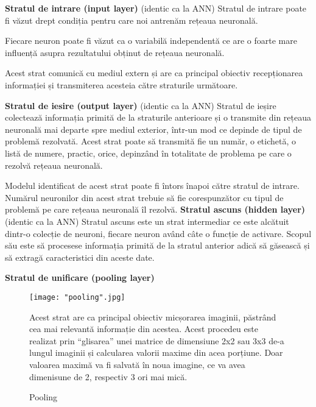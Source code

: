 \documentclass[a4paper, 12pt]{article}
\begin{document}
\begin{outline}
\begin{figure}[!htb]
		\end{figure}\par
		\bigskip
		\1 \textbf{Stratul de intrare (input layer)} (identic ca la ANN) \textbf{\cite{brandonrohrer}}
		\2 \quad Stratul de intrare poate fi văzut drept condiția pentru care noi antrenăm rețeaua neuronală. 
		
		\quad Fiecare neuron poate fi văzut ca o variabilă independentă ce are o foarte mare influență asupra rezultatului obținut de rețeaua neuronală. 
		
		\quad Acest strat comunică cu mediul extern și are ca principal obiectiv recepționarea informației și transmiterea acesteia către straturile următoare.
		
		\bigskip
		\1 \textbf{Stratul de iesire (output layer)} (identic ca la ANN) \textbf{\cite{brandonrohrer}}
		\2 \quad Stratul de ieșire colectează informația primită de la straturile anterioare și o transmite din rețeaua neuronală mai departe spre mediul exterior, într-un mod ce depinde de tipul de problemă rezolvată. Acest strat poate să transmită fie un număr, o etichetă, o listă de numere, practic, orice, depinzând în totalitate de problema pe care o rezolvă rețeaua neuronală.
		
		\quad Modelul identificat de acest strat poate fi întors înapoi către stratul de intrare. Numărul neuronilor din acest strat trebuie să fie corespunzător cu tipul de problemă pe	care rețeaua neuronală îl rezolvă.
		\1 \textbf{Stratul ascuns (hidden layer)} (identic ca la ANN)	 \textbf{\cite{brandonrohrer}}
		\2 \quad Stratul ascuns este un strat intermediar ce este alcătuit dintr-o colecție de neuroni, fiecare neuron având câte o funcție de activare. Scopul său este să procesese informația primită de la stratul anterior adică să găsească și să extragă caracteristici din aceste date.
		
		\bigskip
		\1 \textbf{Stratul de unificare (pooling layer)} \textbf{\cite{brandonrohrer}}
		\bigskip
		\begin{figure}[!htb]
			\centering
			\begin{minipage}{0.4\textwidth}
				\centering
				\texttt{[image: "pooling".jpg]}
				\caption{Pooling \textbf{\cite{brandonrohrer}} }\label{fig:pooling}
			\end{minipage}
			\begin{minipage}{0.5\textwidth}
				\centering
				Acest strat are ca principal obiectiv micșorarea imaginii, păstrând cea mai relevantă informație din acestea. Acest procedeu este realizat prin “glisarea” unei matrice de dimensiune 2x2 sau 3x3 de-a lungul imaginii și calcularea valorii maxime din acea porțiune. Doar valoarea maximă va fi salvată în noua imagine, ce va avea dimenisune de 2, respectiv 3 ori mai mică.
				

\end{minipage}
\end{figure}
\end{outline}
\end{document}
